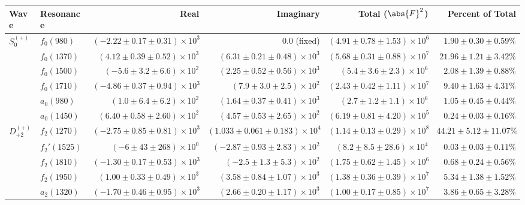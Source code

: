 \begin{table}[ht]
    \begin{center}
        \begin{tabular}{llrrrr}\toprule
        Wave & Resonance & Real & Imaginary & Total ($\abs{F}^2$) & Percent of Total \\\midrule
$S_{0}^{(+)}$ & $f_{0}(980)$ & $(-2.22 \pm 0.17 \pm 0.31) \times 10^{3}$ & $0.0$ (fixed) & $(4.91 \pm 0.78 \pm 1.53) \times 10^{6}$ & $1.90 \pm 0.30 \pm 0.59 \%$ \\
 & $f_{0}(1370)$ & $(4.12 \pm 0.39 \pm 0.52) \times 10^{3}$ & $(6.31 \pm 0.21 \pm 0.48) \times 10^{3}$ & $(5.68 \pm 0.31 \pm 0.88) \times 10^{7}$ & $21.96 \pm 1.21 \pm 3.42 \%$ \\
 & $f_{0}(1500)$ & $(-5.6 \pm 3.2 \pm 6.6) \times 10^{2}$ & $(2.25 \pm 0.52 \pm 0.56) \times 10^{3}$ & $(5.4 \pm 3.6 \pm 2.3) \times 10^{6}$ & $2.08 \pm 1.39 \pm 0.88 \%$ \\
 & $f_{0}(1710)$ & $(-4.86 \pm 0.37 \pm 0.94) \times 10^{3}$ & $(7.9 \pm 3.0 \pm 2.5) \times 10^{2}$ & $(2.43 \pm 0.42 \pm 1.11) \times 10^{7}$ & $9.40 \pm 1.63 \pm 4.31 \%$ \\
 & $a_{0}(980)$ & $(1.0 \pm 6.4 \pm 6.2) \times 10^{2}$ & $(1.64 \pm 0.37 \pm 0.41) \times 10^{3}$ & $(2.7 \pm 1.2 \pm 1.1) \times 10^{6}$ & $1.05 \pm 0.45 \pm 0.44 \%$ \\
 & $a_{0}(1450)$ & $(6.40 \pm 0.58 \pm 2.60) \times 10^{2}$ & $(4.57 \pm 0.53 \pm 2.65) \times 10^{2}$ & $(6.19 \pm 0.81 \pm 4.20) \times 10^{5}$ & $0.24 \pm 0.03 \pm 0.16 \%$ \\
$D_{+2}^{(+)}$ & $f_{2}(1270)$ & $(-2.75 \pm 0.85 \pm 0.81) \times 10^{3}$ & $(1.033 \pm 0.061 \pm 0.183) \times 10^{4}$ & $(1.14 \pm 0.13 \pm 0.29) \times 10^{8}$ & $44.21 \pm 5.12 \pm 11.07 \%$ \\
 & $f_{2}'(1525)$ & $(-6 \pm 43 \pm 268) \times 10^{0}$ & $(-2.87 \pm 0.93 \pm 2.83) \times 10^{2}$ & $(8.2 \pm 8.5 \pm 28.6) \times 10^{4}$ & $0.03 \pm 0.03 \pm 0.11 \%$ \\
 & $f_{2}(1810)$ & $(-1.30 \pm 0.17 \pm 0.53) \times 10^{3}$ & $(-2.5 \pm 1.3 \pm 5.3) \times 10^{2}$ & $(1.75 \pm 0.62 \pm 1.45) \times 10^{6}$ & $0.68 \pm 0.24 \pm 0.56 \%$ \\
 & $f_{2}(1950)$ & $(1.00 \pm 0.33 \pm 0.49) \times 10^{3}$ & $(3.58 \pm 0.84 \pm 1.07) \times 10^{3}$ & $(1.38 \pm 0.36 \pm 0.39) \times 10^{7}$ & $5.34 \pm 1.38 \pm 1.52 \%$ \\
 & $a_{2}(1320)$ & $(-1.70 \pm 0.46 \pm 0.95) \times 10^{3}$ & $(2.66 \pm 0.20 \pm 1.17) \times 10^{3}$ & $(1.00 \pm 0.17 \pm 0.85) \times 10^{7}$ & $3.86 \pm 0.65 \pm 3.28 \%$ \\

\end{tabular}
\end{center}
\end{table}
